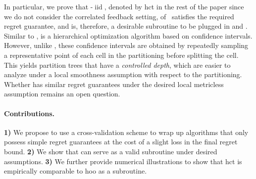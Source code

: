 In particular, we prove that \HCT-$\operatorname{iid}$, denoted by \gls{hct} in the rest of the paper since we do not consider the correlated feedback setting, of~\cite{azar2014online} satisfies the required regret guarantee, and is, therefore, a desirable subroutine to be plugged in \POO{} and \GPO{}. Similar to \HOO{}, \HCT{} is a hierarchical optimization algorithm based on confidence intervals. However, unlike \HOO{}, these confidence intervals are obtained by repeatedly sampling a representative point of each cell in the partitioning before splitting the cell. This yields partition trees that have a \emph{controlled depth}, which are easier to analyze under a local smoothness assumption with respect to the partitioning. Whether \HOO{} has similar regret guarantees under the desired local metricless assumption remains an open question.

\paragraph{Contributions.}
\textbf{1)} We propose to use a cross-validation scheme to wrap up algorithms that only possess simple regret guarantees at the cost of a slight loss in the final regret bound.
\textbf{2)} We show that \HCT{} can serve as a valid subroutine under desired assumptions.
\textbf{3)} We further provide numerical illustrations to show that \gls{hct} is empirically comparable to \gls{hoo} as a subroutine.



